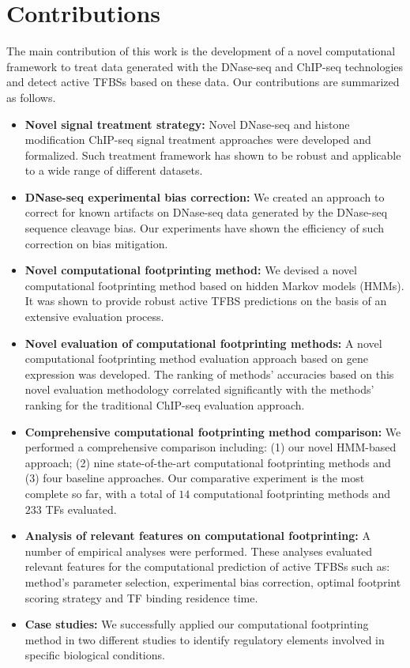 \section{Contributions}
\label{sec:contributions}

The main contribution of this work is the development of a novel computational framework to treat data generated with the DNase-seq and ChIP-seq technologies and detect active TFBSs based on these data. Our contributions are summarized as follows.

\begin{itemize}
  \item \textbf{Novel signal treatment strategy:} Novel DNase-seq and histone modification ChIP-seq signal treatment approaches were developed and formalized. Such treatment framework has shown to be robust and applicable to a wide range of different datasets.
  \item \textbf{DNase-seq experimental bias correction:} We created an approach to correct for known artifacts on DNase-seq data generated by the DNase-seq sequence cleavage bias. Our experiments have shown the efficiency of such correction on bias mitigation.
  \item \textbf{Novel computational footprinting method:} We devised a novel computational footprinting method based on hidden Markov models (HMMs). It was shown to provide robust active TFBS predictions on the basis of an extensive evaluation process.
  \item \textbf{Novel evaluation of computational footprinting methods:} A novel computational footprinting method evaluation approach based on gene expression was developed. The ranking of methods' accuracies based on this novel evaluation methodology correlated significantly with the methods' ranking for the traditional ChIP-seq evaluation approach.
  \item \textbf{Comprehensive computational footprinting method comparison:} We performed a comprehensive comparison including: (1) our novel HMM-based approach; (2) nine state-of-the-art computational footprinting methods and (3) four baseline approaches. Our comparative experiment is the most complete so far, with a total of $14$ computational footprinting methods and $233$ TFs evaluated.
  \item \textbf{Analysis of relevant features on computational footprinting:} A number of empirical analyses were performed. These analyses evaluated relevant features for the computational prediction of active TFBSs such as: method's parameter selection, experimental bias correction, optimal footprint scoring strategy and TF binding residence time.
  \item \textbf{Case studies:} We successfully applied our computational footprinting method in two different studies to identify regulatory elements involved in specific biological conditions.
\end{itemize}

